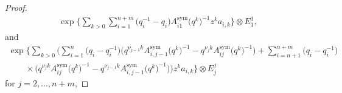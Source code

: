 \documentclass[pdftex]{sigma}
\numberwithin{equation}{section}
\begin{document}
\begin{proof}
\begin{gather}\label{Ai-1}
 \exp\Biggl\{\sum\limits_{k>0}\sum\limits_{i=1}^{n+m}\bigl(q_i^{-1}-q_i\bigr)
 A_{i1}^{\operatorname{sym}}\bigl(q^k\bigr)^{-1} z^k
 a_{i,k}\Biggr\}\otimes E^1_1,
\end{gather}
and
\begin{gather}
 \exp\Biggl\{\sum\limits_{k>0}\Biggl(\sum\limits_{i=1}^{n}\bigl(q_i-q_i^{-1}\bigr)
 \bigl(q^{\nu_{j-1}k}A_{i,j-1}^{\operatorname{sym}}\bigl(q^k\bigr)^{-1}-q^{\nu_jk}A_{ij}^{\operatorname{sym}}\bigl(q^k\bigr)^{-1}\bigr)+ \sum\limits_{i=n+1}^{n+m}\bigl(q_i-q_i^{-1}\bigr)\nonumber\\
 \qquad\times \bigl(q^{\nu_jk}A_{ij}^{\operatorname{sym}}\bigl(q^k\bigr)^{-1}-q^{\nu_{j-1}k}A_{i,j-1}^{\operatorname{sym}}\bigl(q^k\bigr)^{-1}\bigr)\bigr) z^k
 a_{i,k}\bigr\}\otimes E^j_j\label{Aij}
\end{gather}
for $j=2,\dots,n+m$,


\end{proof}
\end{document}
